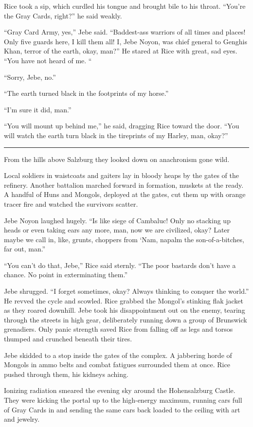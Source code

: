Rice took a sip, which curdled his tongue and brought bile to his throat. ``You're the Gray Cards, right?'' he said weakly.

``Gray Card Army, yes,'' Jebe said. ``Baddest-ass warriors of all times and places! Only five guards here, I kill them all! I, Jebe Noyon, was chief general to Genghis Khan, terror of the earth, okay, man?'' He stared at Rice with great, sad eyes. ``You have not heard of me. ``

``Sorry, Jebe, no.''

``The earth turned black in the footprints of my horse.''

``I'm sure it did, man.''

``You will mount up behind me,'' he said, dragging Rice toward the door. ``You will watch the earth turn black in the tireprints of my Harley, man, okay?''

\fancybreak{* * *}

From the hills above Salzburg they looked down on anachronism gone wild.

Local soldiers in waistcoats and gaiters lay in bloody heaps by the gates of the refinery. Another battalion marched forward in formation, muskets at the ready. A handful of Huns and Mongols, deployed at the gates, cut them up with orange tracer fire and watched the survivors scatter.

Jebe Noyon laughed hugely. ``Is like siege of Cambaluc! Only no stacking up heads or even taking ears any more, man, now we are civilized, okay? Later maybe we call in, like, grunts, choppers from ‘Nam, napalm the son-of-a-bitches, far out, man.''

``You can't do that, Jebe,'' Rice said sternly. ``The poor bastards don't have a chance. No point in exterminating them.''

Jebe shrugged. ``I forget sometimes, okay? Always thinking to conquer the world.'' He revved the cycle and scowled. Rice grabbed the Mongol's stinking flak jacket as they roared downhill. Jebe took his disappointment out on the enemy, tearing through the streets in high gear, deliberately running down a group of Brunswick grenadiers. Only panic strength saved Rice from falling off as legs and torsos thumped and crunched beneath their tires.

Jebe skidded to a stop inside the gates of the complex. A jabbering horde of Mongols in ammo belts and combat fatigues surrounded them at once. Rice pushed through them, his kidneys aching.

Ionizing radiation smeared the evening sky around the Hohensalzburg Castle. They were kicking the portal up to the high-energy maximum, running cars full of Gray Cards in and sending the same cars back loaded to the ceiling with art and jewelry.

